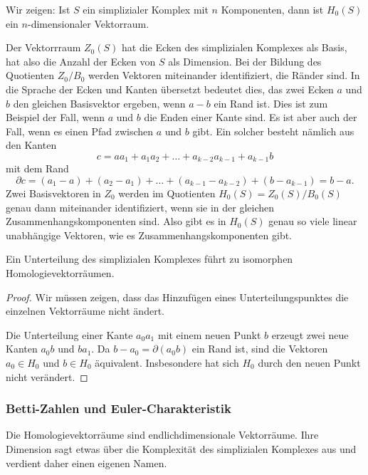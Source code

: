 \begin{beispiel}
Wir zeigen: Ist $S$ ein simplizialer Komplex mit $n$ Komponenten, dann ist 
$H_0(S)$ ein $n$-dimensionaler Vektorraum.
\medskip

Der Vektorrraum $Z_0(S)$ hat die Ecken des simplizialen Komplexes als Basis,
hat also die Anzahl der Ecken von $S$ als Dimension.
Bei der Bildung des Quotienten $Z_0/B_0$ werden Vektoren miteinander
identifiziert, die Ränder sind.
In die Sprache der Ecken und Kanten übersetzt bedeutet dies, das zwei
Ecken $a$ und $b$ den gleichen Basisvektor ergeben, wenn $a-b$ ein
Rand ist.
Dies ist zum Beispiel der Fall, wenn $a$ und $b$ die Enden einer Kante
sind.
Es ist aber auch der Fall, wenn es einen Pfad zwischen $a$ und $b$ gibt.
Ein solcher besteht nämlich aus den Kanten
\[
c = aa_1 + a_1a_2 + \dots + a_{k-2}a_{k-1} + a_{k-1}b
\]
mit dem Rand
\[
\partial c
=
(a_1 - a) + (a_2-a_1) + \dots + (a_{k-1}-a_{k-2}) + (b-a_{k-1})
=
b-a.
\]
Zwei Basisvektoren in $Z_0$ werden im Quotienten $H_0(S)=Z_0(S)/B_0(S)$
genau dann miteinander identifiziert, wenn sie in der gleichen
Zusammenhangskomponenten sind.
Also gibt es in $H_0(S)$ genau so viele linear unabhängige Vektoren,
wie es Zusammenhangskomponenten gibt.
\end{beispiel}

\begin{satz}
\label{buch:topologie:eulercharakteristik:satz:homologieunterteilung}
Ein Unterteilung des simplizialen Komplexes führt zu isomorphen
Homologievektorräumen.
\end{satz}

\begin{proof}
Wir müssen zeigen, dass das Hinzufügen eines Unterteilungspunktes 
die einzelnen Vektorräume nicht ändert.

Die Unterteilung einer Kante $a_0a_1$ mit einem neuen Punkt $b$ erzeugt
zwei neue Kanten $a_0b$ und $ba_1$.
Da $b-a_0=\partial (a_0b)$ ein Rand ist, sind die Vektoren $a_0\in H_0$
und $b\in H_0$ äquivalent.
Insbesondere hat sich $H_0$ durch den neuen Punkt nicht verändert.


\end{proof}

\subsubsection{Betti-Zahlen und Euler-Charakteristik}
Die Homologievektorräume sind endlichdimensionale Vektorräume.
Ihre Dimension sagt etwas über die Komplexität des simplizialen
Komplexes aus und verdient daher einen eigenen Namen.

